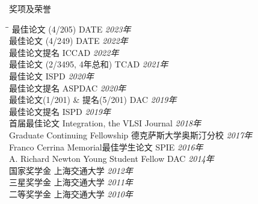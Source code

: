 
\begin{rSection}{奖项及荣誉}
\begin{tabbing}
\hspace{3.8in}\= \hspace{2.6in}\= \kill
最佳论文 (4/205) \> DATE \> {\em 2023年 } \\
最佳论文 (4/249) \> DATE \> {\em 2022年 } \\
最佳论文提名 \> ICCAD \> {\em 2022年 } \\
最佳论文 (2/3495, 4年总和) \> TCAD \> {\em 2021年 } \\
最佳论文 \> ISPD \> {\em 2020年 } \\
最佳论文提名 \> ASPDAC \> {\em 2020年 } \\
最佳论文(1/201) \& 提名(5/201) \> DAC \> {\em 2019年 } \\
最佳论文提名 \> ISPD \> {\em 2019年 } \\
首届最佳论文 \> Integration, the VLSI Journal \> {\em 2018年 } \\
Graduate Continuing Fellowship \> 德克萨斯大学奥斯汀分校 \> {\em 2017年 } \\
Franco Cerrina Memorial最佳学生论文 \> SPIE \> {\em 2016年 } \\
A. Richard Newton Young Student Fellow \> DAC \> {\em 2014年 } \\
国家奖学金 \> 上海交通大学 \> {\em 2012年 } \\
三星奖学金 \> 上海交通大学 \> {\em 2011年 } \\
二等奖学金 \> 上海交通大学 \> {\em 2010年 }
\end{tabbing}
\end{rSection}

